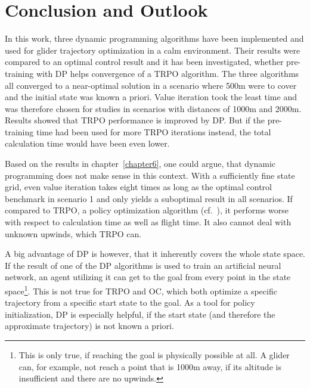 \chapter{Conclusion and Outlook}
\label{chapter8}
In this work, three dynamic programming algorithms have been implemented and used for glider trajectory optimization in a calm environment. Their results were compared to an optimal control result and it has been investigated, whether pre-training with DP helps convergence of a TRPO algorithm. The three algorithms all converged to a near-optimal solution in a scenario where 500m were to cover and the initial state was known a priori. Value iteration took the least time and was therefore chosen for studies in scenarios with distances of 1000m and 2000m. Results showed that TRPO performance is improved by DP. But if the pre-training time had been used for more TRPO iterations instead, the total calculation time would have been even lower.

Based on the results in chapter~\ref{chapter6}, one could argue, that dynamic programming does not make sense in this context. With a sufficiently fine state grid, even value iteration takes eight times as long as the optimal control benchmark in scenario 1 and only yields a suboptimal result in all scenarios. If compared to TRPO, a policy optimization algorithm (cf.~\cite{Zuern2017}), it performs worse with respect to calculation time as well as flight time. It also cannot deal with unknown upwinds, which TRPO can.

A big advantage of DP is however, that it inherently covers the whole state space. If the result of one of the DP algorithms is used to train an artificial neural network, an agent utilizing it can get to the goal from every point in the state space\footnote{This is only true, if reaching the goal is physically possible at all. A glider can, for example, not reach a point that is 1000m away, if its altitude is insufficient and there are no upwinds.}. This is not true for TRPO and OC, which both optimize a specific trajectory from a specific start state to the goal. As a tool for policy initialization, DP is especially helpful, if the start state (and therefore the approximate trajectory) is not known a priori.

